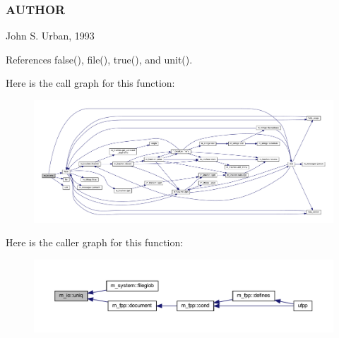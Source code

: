 \subsubsection*{A\+U\+T\+H\+OR}

John S. Urban, 1993 

References false(), file(), true(), and unit().

Here is the call graph for this function\+:
\nopagebreak
\begin{figure}[H]
\begin{center}
\leavevmode
\includegraphics[width=350pt]{namespacem__io_adf7b5088ef3b4daa6c064d3e264ae821_cgraph}
\end{center}
\end{figure}
Here is the caller graph for this function\+:
\nopagebreak
\begin{figure}[H]
\begin{center}
\leavevmode
\includegraphics[width=350pt]{namespacem__io_adf7b5088ef3b4daa6c064d3e264ae821_icgraph}
\end{center}
\end{figure}
